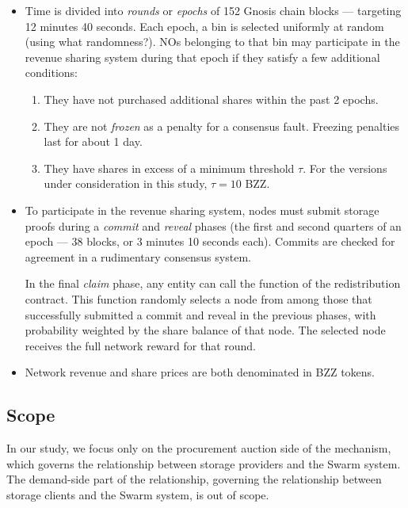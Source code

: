 \begin{itemize}
  \item
    Time is divided into \emph{rounds} or \emph{epochs} of 152 Gnosis chain blocks --- targeting 12 minutes 40 seconds.
    Each epoch, a bin is selected uniformly at random (using what randomness?).
    NOs belonging to that bin may participate in the revenue sharing system during that epoch if they satisfy a few additional conditions:
    \begin{enumerate}
      \item They have not purchased additional shares within the past 2 epochs.
      \item They are not \emph{frozen} as a penalty for a consensus fault. Freezing penalties last for about 1 day.
      \item They have shares in excess of a minimum threshold $\tau$. For the versions under consideration in this study, $\tau=10$ BZZ.
    \end{enumerate}

  \item
    To participate in the revenue sharing system, nodes must submit storage proofs during a \emph{commit} and \emph{reveal} phases (the first and second quarters of an epoch --- 38 blocks, or 3 minutes 10 seconds each).
    Commits are checked for agreement in a rudimentary consensus system.
    
    In the final \emph{claim} phase, any entity can call the  function of the redistribution contract.
    This function randomly selects a node from among those that successfully submitted a commit and reveal in the previous phases, with probability weighted by the share balance of that node.
    The selected node receives the full network reward for that round.

  \item
    Network revenue and share prices are both denominated in BZZ tokens.

\end{itemize}

\subsection{Scope}

In our study, we focus only on the procurement auction side of the mechanism, which governs the relationship between storage providers and the Swarm system.
%
The demand-side part of the relationship, governing the relationship between storage clients and the Swarm system, is out of scope.


